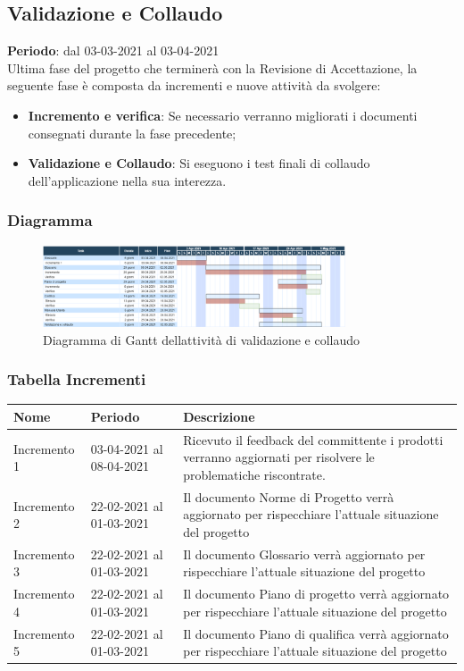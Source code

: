 	\subsection{Validazione e Collaudo}
	\textbf{Periodo}: dal 03-03-2021 al 03-04-2021 \\
	Ultima fase del progetto che terminerà con la Revisione di Accettazione, la seguente fase è composta da incrementi e nuove attività da svolgere:
	\begin{itemize}
		\item \textbf{Incremento e verifica}: Se necessario verranno migliorati i documenti consegnati durante la fase precedente;
		\item \textbf{Validazione e Collaudo}: Si eseguono i test finali di collaudo dell'applicazione nella sua interezza.
	\end{itemize}
	
	\subsubsection{Diagramma}
		\begin{figure}[H]
        		\centering
        		\includegraphics[width=0.8\textwidth]{source/img/Validazione_collaudo.png}
        		\caption{Diagramma di Gantt dell\textquotesingle attività di validazione e collaudo}
    		\end{figure}
	\subsubsection{Tabella Incrementi}
		\begin{center}
    			\begin{tabular}{ | l | p{5cm} | p{8cm} |}
   			 \hline
    			Nome & Periodo & Descrizione \\ \hline
    			Incremento 1 & 03-04-2021 al 08-04-2021 & Ricevuto il feedback del committente i prodotti verranno aggiornati per risolvere le problematiche riscontrate. \\ \hline
    			Incremento 2 & 22-02-2021 al 01-03-2021 & Il documento Norme di Progetto verrà aggiornato per rispecchiare l'attuale situazione del progetto \\ \hline
    			Incremento 3 & 22-02-2021 al 01-03-2021 & Il documento Glossario verrà aggiornato per rispecchiare l'attuale situazione del progetto \\ \hline
			Incremento 4 & 22-02-2021 al 01-03-2021 & Il documento Piano di progetto verrà aggiornato per rispecchiare l'attuale situazione del progetto \\ \hline
			Incremento 5 & 22-02-2021 al 01-03-2021 & Il documento Piano di qualifica verrà aggiornato per rispecchiare l'attuale situazione del progetto \\ \hline
    			\end{tabular}
		\end{center}
